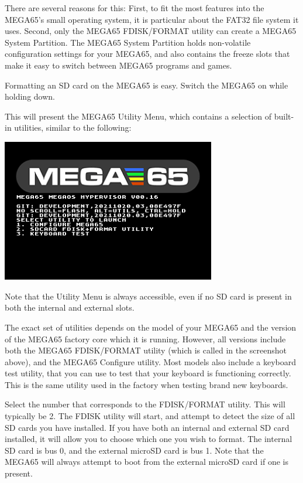 There are several reasons for this: First, to fit the most
features into the MEGA65's small operating system, it is
particular about the FAT32 file system it uses. Second, only the
MEGA65 FDISK/FORMAT utility can create a MEGA65 System Partition. The
MEGA65 System Partition holds non-volatile configuration settings for
your MEGA65, and also contains the freeze slots that make it easy to
switch between MEGA65 programs and games.

Formatting an SD card on the MEGA65 is easy. Switch the MEGA65 on while holding  down.

This will present the MEGA65 Utility Menu, which contains a
selection of built-in utilities, similar to the following:

\begin{center}
\includegraphics[width=0.7\textwidth]{images/ss-utilmenu.png}
\end{center}

Note that the Utility Menu is always accessible, even if no SD card is present in both the internal and external slots.

The exact set of utilities
depends on the model of your MEGA65 and the version of the MEGA65
factory core which it is running. However, all versions include both
the MEGA65 FDISK/FORMAT utility (which is called  in the screenshot above),
and the MEGA65 Configure utility.
Most models also include a keyboard test utility, that you can use
to test that your keyboard is functioning correctly.  This is
the same utility used in the factory when testing brand
new keyboards.

Select the number that corresponds to the FDISK/FORMAT utility.  This
will typically be 2.  The FDISK utility will start, and attempt to
detect the size of all SD cards you have installed.  If you have both
an internal and external SD card installed, it will allow you to
choose which one you wish to format. The internal SD card is bus 0,
and the external microSD card is bus 1. Note that the MEGA65 will
always attempt to boot from the external microSD card if one is
present.

